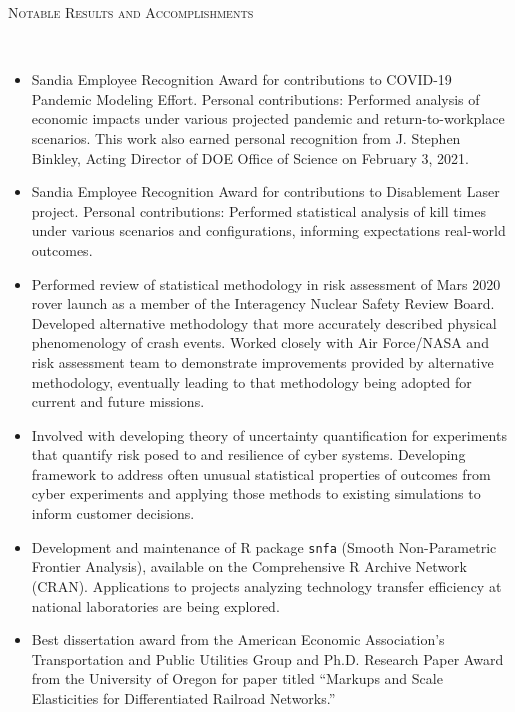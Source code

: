 \documentclass[11pt]{article}
\newenvironment{changemargin}[2]{%
  \begin{list}{}{%
    \setlength{\topsep}{0pt}%
    \setlength{\leftmargin}{#1}%
    \setlength{\rightmargin}{#2}%
    \setlength{\listparindent}{\parindent}%
    \setlength{\itemindent}{\parindent}%
    \setlength{\parsep}{\parskip}%
  }%
  \item[]}{\end{list}
}
\newcommand{\lineover}{
	\begin{changemargin}{-0.05in}{-0.05in}
		\vspace*{-8pt}
		\hrulefill \\
		\vspace*{-2pt}
	\end{changemargin}
}
\newcommand{\header}[1]{
	\begin{changemargin}{-0.5in}{-0.5in}
		\scshape{#1}\\
	\vspace*{-5pt}
  	\lineover
	\end{changemargin}
}
\newenvironment{body} {
	\vspace*{-16pt}
	\begin{changemargin}{-0.25in}{-0.5in}
  }	
	{\end{changemargin}
}
\begin{document}
\smallskip
\header{Notable Results and Accomplishments}
\begin{body}
	\vspace{14pt}
	\begin{itemize}
		\item Sandia Employee Recognition Award for contributions to COVID-19 Pandemic Modeling Effort. Personal contributions: Performed analysis of economic impacts under various projected pandemic and return-to-workplace scenarios. This work also earned personal recognition from J. Stephen Binkley, Acting Director of DOE Office of Science on February 3, 2021.
		\item Sandia Employee Recognition Award for contributions to Disablement Laser project. Personal contributions: Performed statistical analysis of kill times under various scenarios and configurations, informing expectations real-world outcomes.
		\item Performed review of statistical methodology in risk assessment of Mars 2020 rover launch as a member of the Interagency Nuclear Safety Review Board. Developed alternative methodology that more accurately described physical phenomenology of crash events. Worked closely with Air Force/NASA and risk assessment team to demonstrate improvements provided by alternative methodology, eventually leading to that methodology being adopted for current and future missions.
		\item Involved with developing theory of uncertainty quantification for experiments that quantify risk posed to and resilience of cyber systems. Developing framework to address often unusual statistical properties of outcomes from cyber experiments and applying those methods to existing simulations to inform customer decisions.
		\item Development and maintenance of R package \texttt{snfa} (Smooth Non-Parametric Frontier Analysis), available on the Comprehensive R Archive Network (CRAN). Applications to projects analyzing technology transfer efficiency at national laboratories are being explored.
		\item Best dissertation award from the American Economic Association's Transportation and Public Utilities Group and Ph.D. Research Paper Award from the University of Oregon for paper titled ``Markups and Scale Elasticities for Differentiated Railroad Networks.''
	\end{itemize}
\end{body}
\end{document}
